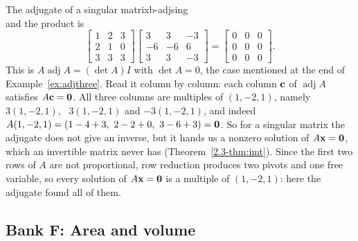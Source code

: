 \documentclass[11pt]{article}
\begin{document}
\begin{exmp}{The adjugate of a singular matrix}{b-adjsing}
\[\]
and the product is
\[
\begin{bmatrix}1&2&3\\2&1&0\\3&3&3\end{bmatrix}\begin{bmatrix}3&3&-3\\-6&-6&6\\3&3&-3\end{bmatrix}=\begin{bmatrix}0&0&0\\0&0&0\\0&0&0\end{bmatrix}.
\]
This is $A\operatorname{adj}A=(\det A)I$ with $\det A=0$, the case mentioned at the end of Example~\ref{ex:adjthree}. Read it column by column: each column $\mathbf{c}$ of $\operatorname{adj}A$ satisfies $A\mathbf{c}=\mathbf{0}$. All three columns are multiples of $(1,-2,1)$, namely $3(1,-2,1)$, \ $3(1,-2,1)$ and $-3(1,-2,1)$, and indeed $A(1,-2,1)=(1-4+3,\ 2-2+0,\ 3-6+3)=\bv{0}$. So for a singular matrix the adjugate does not give an inverse, but it hands us a nonzero solution of $A\mathbf{x}=\mathbf{0}$, which an invertible matrix never has (Theorem~\ref{2.3-thm:imt}). Since the first two rows of $A$ are not proportional, row reduction produces two pivots and one free variable, so every solution of $A\mathbf{x}=\mathbf{0}$ is a multiple of $(1,-2,1)$: here the adjugate found all of them.
\end{exmp}

\subsection*{Bank F: Area and volume}
\end{document}
